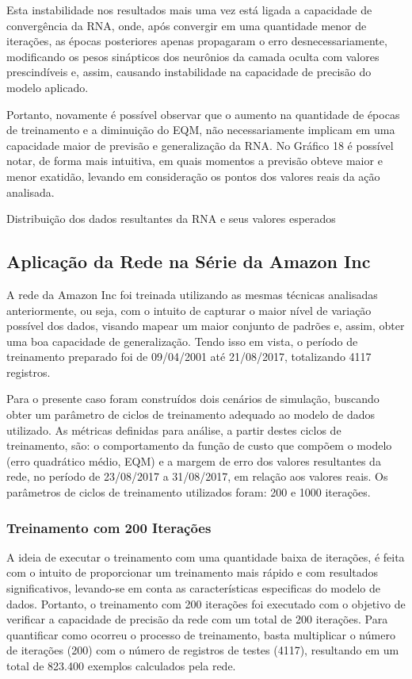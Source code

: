 Esta instabilidade nos resultados mais uma vez está ligada a capacidade de convergência da RNA, onde, após convergir em uma quantidade menor de iterações, as épocas posteriores apenas propagaram o erro desnecessariamente, modificando os pesos sinápticos dos neurônios da camada oculta com valores prescindíveis e, assim, causando instabilidade na capacidade de precisão do modelo aplicado. 

Portanto, novamente é possível observar que o aumento na quantidade de épocas de treinamento e a diminuição do EQM, não necessariamente implicam em uma capacidade maior de previsão e generalização da RNA. No Gráfico 18 é possível notar, de forma mais intuitiva, em quais momentos a previsão obteve maior e menor exatidão, levando em consideração os pontos dos valores reais da ação analisada.
\begin{grafico}[h]
	\centering
	\caption{Distribuição dos dados resultantes da RNA e seus valores esperados}
	\label{lingua}
\end{grafico}

\subsection{Aplicação da Rede na Série da Amazon Inc}
A rede da Amazon Inc foi treinada utilizando as mesmas técnicas analisadas anteriormente, ou seja, com o intuito de capturar o maior nível de variação possível dos dados, visando mapear um maior conjunto de padrões e, assim, obter uma boa capacidade de generalização. Tendo isso em vista, o período de treinamento preparado foi de 09/04/2001 até 21/08/2017, totalizando 4117 registros.

Para o presente caso foram construídos dois cenários de simulação, buscando obter um parâmetro de ciclos de treinamento adequado ao modelo de dados utilizado. As métricas definidas para análise, a partir destes ciclos de treinamento, são: o comportamento da função de custo que compõem o modelo (erro quadrático médio, EQM) e a margem de erro dos valores resultantes da rede, no período de 23/08/2017 a 31/08/2017, em relação aos valores reais. Os parâmetros de ciclos de treinamento utilizados foram: 200 e 1000 iterações.

\subsubsection{Treinamento com 200 Iterações}	
A ideia de executar o treinamento com uma quantidade baixa de iterações, é feita com o intuito de proporcionar um treinamento mais rápido e com resultados significativos, levando-se em conta as características especificas do modelo de dados. Portanto, o treinamento com 200 iterações foi executado com o objetivo de verificar a capacidade de precisão da rede com um total de 200 iterações. Para quantificar como ocorreu o processo de treinamento, basta multiplicar o número de iterações (200) com o número de registros de testes (4117), resultando em um total de 823.400 exemplos calculados pela rede.

